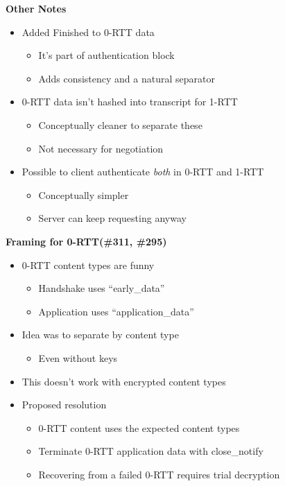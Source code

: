 \documentclass[helvetica]{seminar}
\newcommand{\heading}[1]{%
  \begin{center} 
    \large\bf 
    #1 
  \end{center} 
  \vspace{.4 in}}
\begin{document}
\begin{slide}
\heading{Other Notes}

\begin{itemize}
\item Added Finished to 0-RTT data
  \begin{itemize}
  \item It's part of authentication block
  \item Adds consistency and a natural separator
  \end{itemize}

\item 0-RTT data isn't hashed into transcript for 1-RTT
  \begin{itemize}
  \item Conceptually cleaner to separate these
  \item Not necessary for negotiation
  \end{itemize}

\item Possible to client authenticate \emph{both} in 0-RTT and 1-RTT
  \begin{itemize}
  \item Conceptually simpler
  \item Server can keep requesting anyway
  \end{itemize}
\end{itemize}
\end{slide}

\begin{slide}
  \heading{Framing for 0-RTT(\#311, \#295)}

  \begin{itemize}
  \item 0-RTT content types are funny
    \begin{itemize}
    \item Handshake uses ``early\_data''
    \item Application uses ``application\_data''
    \end{itemize}
  \item Idea was to separate by content type
    \begin{itemize}
    \item Even without keys
    \end{itemize}

  \item This doesn't work with encrypted content types
  \item Proposed resolution
    \begin{itemize}
    \item 0-RTT content uses the expected content types
    \item Terminate 0-RTT application data with close\_notify
    \item Recovering from a failed 0-RTT requires trial decryption
    \end{itemize}
  \end{itemize}
\end{slide}
\end{document}
